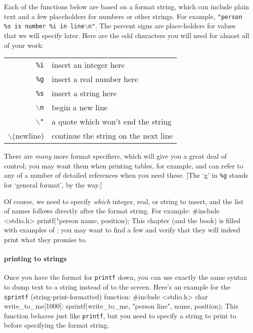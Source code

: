 \documentclass[12pt]{article}
\makeatletter
\def\ttind#1{\index{#1@{\tt #1}}{\tt #1}}
\makeatother
\begin{document}
Each of the functions below are based on a
format string, which can include plain text and a few placeholders for numbers or other strings. For
example, {\tt "person \%s is number \%i in line$\backslash$n"}. The percent signs are place-holders for values that we
will specify later. Here are the odd characters you will need for almost all of your work:

\begin{tabular}{rl}
{\tt \%i}	& insert an integer here\\
{\tt \%g}	& insert a real number here\\
{\tt \%s}	& insert a string here\\
{\tt $\backslash$n}	& begin a new line\\
{\tt $\backslash$"}	& a quote which won't end the string\\
$\backslash$(newline)	& continue the string on the next line
\end{tabular}

There are {\sl many} more format specifiers, which will give you a great deal of control; you may want
them when printing tables, for example, and can refer to any of a number of detailed references when you
need these. [The `g' in {\tt \%g} stands for `general format', by the way.]

Of course, we need to specify {\sl which} integer, real, or string to insert, and the list of names
follows directly after the format string. For example:
#include <stdio.h>
printf("person %
                          name, position);
This chapter (and the book) is filled with examples of \ttind{printf}; you may want to find a few and
verify that they will indeed print what they promise to.

\paragraph{printing to strings} Once you have the format for {\tt printf} down, you can use exactly the
same syntax to dump text to a string instead of to the screen. Here's an example for the {\tt sprintf}
(string-print-formatted) function:
#include <stdio.h>
char write_to_me[1000];
sprintf(write_to_me, "person %
                             line\n", name, position);
This function behaves just like {\tt printf}, but you need to specify
a string to print to before specifying the format string. 
\end{document}
